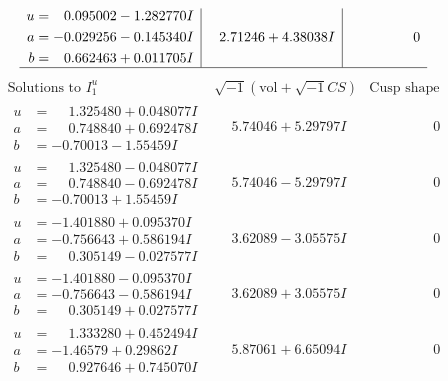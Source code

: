 \documentclass[1p]{elsarticle_modified}
\theoremstyle{definition}
\newcommand{\I}{\sqrt{-1}}
\begin{document}
$$\begin{array}{c|c|c}
\begin{aligned}
u &= \phantom{-}0.095002 - 1.282770 I \\
a &= -0.029256 - 0.145340 I \\
b &= \phantom{-}0.662463 + 0.011705 I\end{aligned}
 & \phantom{-}2.71246 + 4.38038 I & \phantom{-0.000000 } 0\\
 \hline 
 \end{array}$$\newpage$$\begin{array}{c|c|c}  
\text{Solutions to }I^u_{1}& \I (\text{vol} + \sqrt{-1}CS) & \text{Cusp shape}\\
 \hline 
\begin{aligned}
u &= \phantom{-}1.325480 + 0.048077 I \\
a &= \phantom{-}0.748840 + 0.692478 I \\
b &= -0.70013 - 1.55459 I\end{aligned}
 & \phantom{-}5.74046 + 5.29797 I & \phantom{-0.000000 } 0 \\ \hline\begin{aligned}
u &= \phantom{-}1.325480 - 0.048077 I \\
a &= \phantom{-}0.748840 - 0.692478 I \\
b &= -0.70013 + 1.55459 I\end{aligned}
 & \phantom{-}5.74046 - 5.29797 I & \phantom{-0.000000 } 0 \\ \hline\begin{aligned}
u &= -1.401880 + 0.095370 I \\
a &= -0.756643 + 0.586194 I \\
b &= \phantom{-}0.305149 - 0.027577 I\end{aligned}
 & \phantom{-}3.62089 - 3.05575 I & \phantom{-0.000000 } 0 \\ \hline\begin{aligned}
u &= -1.401880 - 0.095370 I \\
a &= -0.756643 - 0.586194 I \\
b &= \phantom{-}0.305149 + 0.027577 I\end{aligned}
 & \phantom{-}3.62089 + 3.05575 I & \phantom{-0.000000 } 0 \\ \hline\begin{aligned}
u &= \phantom{-}1.333280 + 0.452494 I \\
a &= -1.46579 + 0.29862 I \\
b &= \phantom{-}0.927646 + 0.745070 I\end{aligned}
 & \phantom{-}5.87061 + 6.65094 I & \phantom{-0.000000 } 0 \\ \hline\begin{aligned}

\end{aligned}
\end{array}$$
\end{document}
